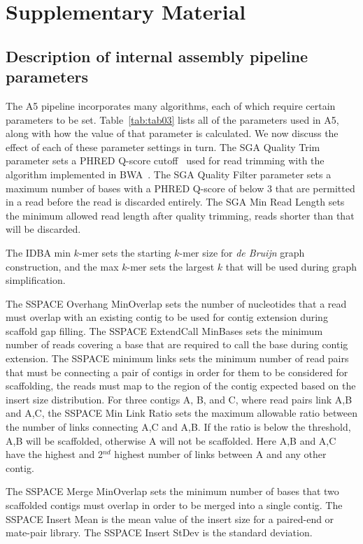 \documentclass[10pt]{article}
\begin{document}
\clearpage

\section*{Supplementary Material}
\subsection*{Description of internal assembly pipeline parameters}

The A5 pipeline incorporates many algorithms, each of which require certain parameters to be set.
Table~\ref{tab:tab03} lists all of the parameters used in A5, along with how the value
of that parameter is calculated. We now discuss the effect of each of these parameter settings in turn.  
The SGA Quality Trim parameter sets a PHRED Q-score cutoff~\cite{Ewing1998} used for read trimming with the algorithm
implemented in BWA~\cite{bwa}. The SGA Quality Filter parameter sets a maximum number of bases
with a PHRED Q-score of below 3 that are permitted in a read before the read is discarded entirely.
The SGA Min Read Length sets the minimum allowed read length after quality trimming, reads shorter
than that will be discarded.

The IDBA min $k$-mer sets the starting $k$-mer size for \emph{de Bruijn} graph construction, and the max $k$-mer sets
the largest $k$ that will be used during graph simplification.

The SSPACE Overhang MinOverlap sets the number of nucleotides that a read must overlap with an existing
contig to be used for contig extension during scaffold gap filling. The SSPACE ExtendCall MinBases sets the minimum
number of reads covering a base that are required to call the base during contig extension. The SSPACE minimum
links sets the minimum number of read pairs that must be connecting a pair of contigs in order for them to be considered
for scaffolding, the reads must map to the region of the contig expected based on the insert size distribution.
For three contigs A, B, and C, where read pairs link A,B and A,C, the SSPACE Min Link Ratio sets the 
maximum allowable ratio between the number of links connecting A,C and A,B. If the ratio is below the threshold,
A,B will be scaffolded, otherwise A will not be scaffolded. Here A,B and A,C have the highest and 2$^{nd}$ highest number
of links between A and any other contig.

The SSPACE Merge MinOverlap sets the minimum number of bases that two scaffolded contigs must overlap in order to be merged
into a single contig.  The SSPACE Insert Mean is the mean value of the insert size for a paired-end or mate-pair library. 
The SSPACE Insert StDev is the standard deviation.
\end{document}
